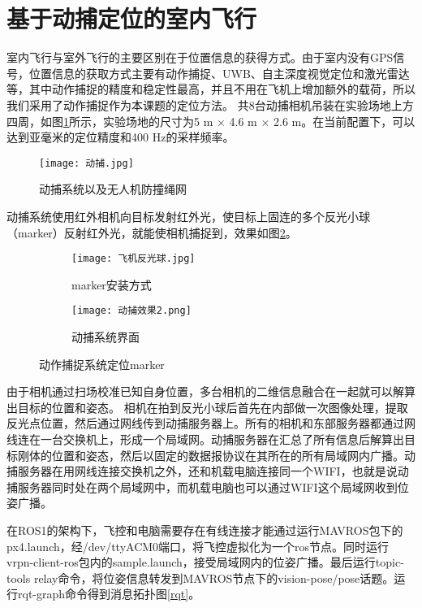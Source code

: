   \section{基于动捕定位的室内飞行}
室内飞行与室外飞行的主要区别在于位置信息的获得方式。由于室内没有GPS信号，位置信息的获取方式主要有动作捕捉、UWB、自主深度视觉定位和激光雷达等，其中动作捕捉的精度和稳定性最高，并且不用在飞机上增加额外的载荷，所以我们采用了动作捕捉作为本课题的定位方法。
共8台动捕相机吊装在实验场地上方四周，如图\ref{动捕}所示，实验场地的尺寸为5 m $\times$ 4.6 m $\times$ 2.6 m。在当前配置下，可以达到亚毫米的定位精度和400 Hz的采样频率\cite{qingtong}。
\begin{figure}[!h]
  \centering
  \texttt{[image: 动捕.jpg]}
  \caption{动捕系统以及无人机防撞绳网}
  \label{动捕}
\end{figure}
动捕系统使用红外相机向目标发射红外光，使目标上固连的多个反光小球（marker）反射红外光，就能使相机捕捉到，效果如图\ref{反光小球}。


\begin{figure}[h]
  \centering
  \begin{subfigure}[c]{0.4\textwidth}
    \centering
    \texttt{[image: 飞机反光球.jpg]}
    \caption{marker安装方式}
  \end{subfigure}\hfill
    \begin{subfigure}[c]{0.55\textwidth}
      \centering
      \texttt{[image: 动捕效果2.png]}
      \caption{动捕系统界面}
  \end{subfigure}
  \caption{动作捕捉系统定位marker}
  \label{反光小球}
  \end{figure}


由于相机通过扫场校准已知自身位置，多台相机的二维信息融合在一起就可以解算出目标的位置和姿态。
相机在拍到反光小球后首先在内部做一次图像处理，提取反光点位置，然后通过网线传到动捕服务器上。所有的相机和东部服务器都通过网线连在一台交换机上，形成一个局域网。动捕服务器在汇总了所有信息后解算出目标刚体的位置和姿态，然后以固定的数据报协议在其所在的所有局域网内广播。动捕服务器在用网线连接交换机之外，还和机载电脑连接同一个WIFI，也就是说动捕服务器同时处在两个局域网中，而机载电脑也可以通过WIFI这个局域网收到位姿广播。

在ROS1的架构下，飞控和电脑需要存在有线连接才能通过运行MAVROS包下的px4.launch，经/dev/ttyACM0端口，将飞控虚拟化为一个ros节点。同时运行vrpn-client-ros包内的sample.launch，接受局域网内的位姿广播。最后运行topic-tools relay命令，将位姿信息转发到MAVROS节点下的vision-pose/pose话题。运行rqt-graph命令得到消息拓扑图\ref{rqt}。

